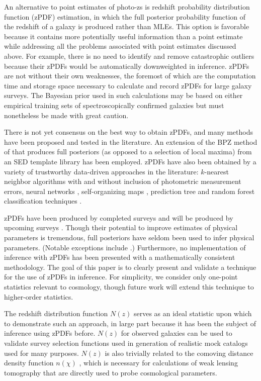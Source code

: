 \documentclass[preprint]{aastex}
\begin{document}
An alternative to point estimates of photo-zs is redshift probability distribution function (zPDF) estimation, in which the full posterior probability function of the redshift of a galaxy is produced rather than MLEs.  \citep{bud08}  This option is favorable because it contains more potentially useful information than a point estimate while addressing all the problems associated with point estimates discussed above.  For example, there is no need to identify and remove catastrophic outliers because their zPDFs would be automatically downweighted in inference.  zPDFs are not without their own weaknesses, the foremost of which are the computation time and storage space necessary to calculate and record zPDFs for large galaxy surveys.  \citep{car14b}  The Bayesian prior used in such calculations may be based on either empirical training sets of spectroscopically confirmed galaxies but must nonetheless be made with great caution.

There is not yet consensus on the best way to obtain zPDFs, and many methods have been proposed and tested in the literature.  An extension of the BPZ method of \citet{ben00} that produces full posteriors (as opposed to a selection of local maxima) from an SED template library has been employed.  \citep{hil11, kel12, lop14}  zPDFs have also been obtained by a variety of trustworthy data-driven approaches in the literature: $k$-nearest neighbor algorithms with \citep{bal08} and without \citep{she11} inclusion of photometric measurement errors, neural networks \citep{bon13}, self-organizing maps \citep{car14a}, prediction tree and random forest classification techniques \citep{car10, car13}.  

zPDFs have been produced by completed surveys \citep{hil11, she11} and will be produced by upcoming surveys \citep{abe09, car14a}.  Though their potential to improve estimates of physical parameters is tremendous, full posteriors have seldom been used to infer physical parameters.  (Notable exceptions include \citet{app12}.)  Furthermore, no implementation of inference with zPDFs has been presented with a mathematically consistent methodology.  The goal of this paper is to clearly present and validate a technique for the use of zPDFs in inference.  For simplicity, we consider only one-point statistics relevant to cosmology, though future work will extend this technique to higher-order statistics.

The redshift distribution function $N(z)$ serves as an ideal statistic upon which to demonstrate such an approach, in large part because it has been the subject of inference using zPDFs before.  \citep{she11, kel12, ben12, bon13, vii15}  $N(z)$ for observed galaxies can be used to validate survey selection functions used in generation of realistic mock catalogs used for many purposes.  \citep{nor01}  $N(z)$ is also trivially related to the comoving distance density function $n(\chi)$ \citep{hog99}, which is necessary for calculations of weak lensing tomography that are directly used to probe cosmological parameters.  
\end{document}
